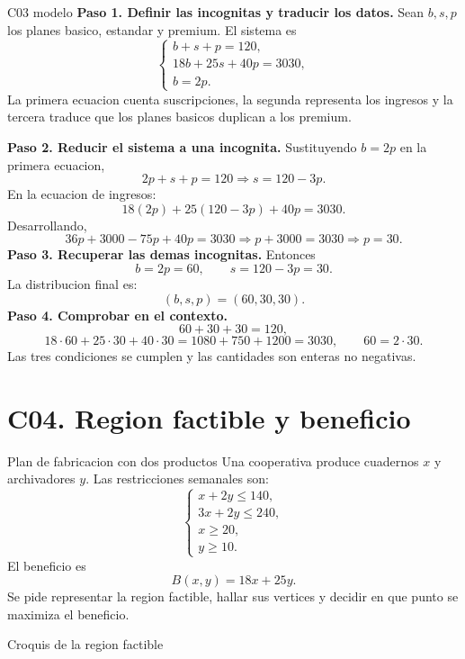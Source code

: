 \begin{fullsolution}{C03 modelo}
\textbf{Paso 1. Definir las incognitas y traducir los datos.}
Sean \(b,s,p\) los planes basico, estandar y premium. El sistema es
\[
\begin{cases}
b+s+p=120,\\
18b+25s+40p=3030,\\
b=2p.
\end{cases}
\]
La primera ecuacion cuenta suscripciones, la segunda representa los ingresos y la tercera
traduce que los planes basicos duplican a los premium.

\textbf{Paso 2. Reducir el sistema a una incognita.}
Sustituyendo \(b=2p\) en la primera ecuacion,
\[
2p+s+p=120 \Longrightarrow s=120-3p.
\]
En la ecuacion de ingresos:
\[
18(2p)+25(120-3p)+40p=3030.
\]
Desarrollando,
\[
36p+3000-75p+40p=3030
\Longrightarrow p+3000=3030
\Longrightarrow p=30.
\]
\textbf{Paso 3. Recuperar las demas incognitas.}
Entonces
\[
b=2p=60,\qquad s=120-3p=30.
\]
La distribucion final es:
\[
(b,s,p)=(60,30,30).
\]
\textbf{Paso 4. Comprobar en el contexto.}
\[
60+30+30=120,
\]
\[
18\cdot60+25\cdot30+40\cdot30=1080+750+1200=3030,
\qquad 60=2\cdot30.
\]
Las tres condiciones se cumplen y las cantidades son enteras no negativas.
\end{fullsolution}

\section{C04. Region factible y beneficio}

\begin{contextproblem}{Plan de fabricacion con dos productos}
Una cooperativa produce cuadernos \(x\) y archivadores \(y\). Las restricciones semanales son:
\[
\begin{cases}
x+2y\leq 140,\\
3x+2y\leq 240,\\
x\geq 20,\\
y\geq 10.
\end{cases}
\]
El beneficio es
\[
B(x,y)=18x+25y.
\]
Se pide representar la region factible, hallar sus vertices y decidir en que punto se maximiza
el beneficio.
\end{contextproblem}

\begin{databox}{Croquis de la region factible}
\begin{center}
\end{center}
\end{databox}

